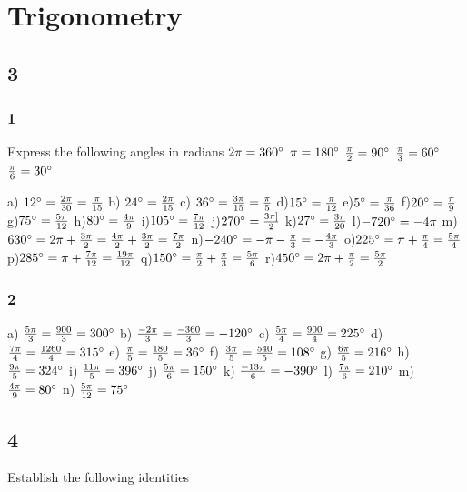 \documentclass[]{report}
\begin{document}
\section{Trigonometry}

\subsection{3}

\subsubsection{1}

Express the following angles in radians
$2\pi = 360\degree$
$\pi = 180\degree$
$\frac{\pi}{2} = 90\degree$
$\frac{\pi}{3} = 60\degree$
$\frac{\pi}{6} = 30\degree$

a) $12\degree = \frac{2\pi}{30} = \frac{\pi}{15}$
b) $24\degree = \frac{2\pi}{15}$
c) $36\degree = \frac{3\pi}{15} = \frac{\pi}{5}$
d)$15\degree = \frac{\pi}{12}$
e)$5\degree = \frac{\pi}{36}$
f)$20\degree = \frac{\pi}{9}$
g)$75\degree = \frac{5\pi}{12}$
h)$80\degree = \frac{4\pi}{9}$
i)$105\degree = \frac{7\pi}{12}$
j)$270\degree = \frac{3\pi]}{2}$
k)$27\degree = \frac{3\pi}{20}$
l)$-720\degree = -4\pi$
m)$630\degree = 2\pi + \frac{3\pi}{2} = \frac{4\pi}{2} + \frac{3\pi}{2} = \frac{7\pi}{2}$
n)$-240\degree = -\pi - \frac{\pi}{3} = -\frac{4\pi}{3}$
o)$225\degree = \pi + \frac{\pi}{4} = \frac{5\pi}{4}$
p)$285\degree = \pi + \frac{7\pi}{12} = \frac{19\pi}{12}$
q)$150\degree = \frac{\pi}{2} + \frac{\pi}{3} = \frac{5\pi}{6}$
r)$450\degree = 2\pi + \frac{\pi}{2} = \frac{5\pi}{2}$

\subsubsection{2}
a) $\frac{5\pi}{3} = \frac{900}{3} = 300\degree$
b) $\frac{-2\pi}{3} = \frac{-360}{3} = -120\degree$
c) $\frac{5\pi}{4} = \frac{900}{4} = 225\degree$
d)$\frac{7\pi}{4} = \frac{1260}{4} = 315\degree$
e) $\frac{\pi}{5} = \frac{180}{5} = 36\degree$
f) $\frac{3\pi}{5} = \frac{540}{5} = 108\degree$
g) $\frac{6\pi}{5} = 216\degree$
h) $\frac{9\pi}{5} = 324\degree$
i) $\frac{11\pi}{5} = 396\degree$
j) $\frac{5\pi}{6} = 150\degree$
k) $\frac{-13\pi}{6} = -390\degree$
l) $\frac{7\pi}{6} = 210\degree$
m) $\frac{4\pi}{9} = 80\degree$
n) $\frac{5\pi}{12} = 75\degree$


\subsection{4}
Establish the following identities
\end{document}
